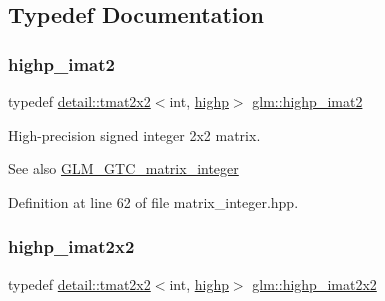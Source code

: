 \subsection{Typedef Documentation}
\mbox{\label{group__gtc__matrix__integer_ga70eae282157f23589db24f4664bbf956}} 
\subsubsection{\texorpdfstring{highp\+\_\+imat2}{highp\_imat2}}
{\footnotesize\ttfamily typedef \hyperlink{structglm_1_1detail_1_1tmat2x2}{detail\+::tmat2x2}$<$int, \hyperlink{namespaceglm_a0f04f086094c747d227af4425893f545ac6f7eab42eacbb10d59a58e95e362074}{highp}$>$ \hyperlink{group__gtc__matrix__integer_ga70eae282157f23589db24f4664bbf956}{glm\+::highp\+\_\+imat2}}

High-\/precision signed integer 2x2 matrix. \begin{DoxySeeAlso}{See also}
\hyperlink{group__gtc__matrix__integer}{G\+L\+M\+\_\+\+G\+T\+C\+\_\+matrix\+\_\+integer} 
\end{DoxySeeAlso}


Definition at line 62 of file matrix\+\_\+integer.\+hpp.

\mbox{\label{group__gtc__matrix__integer_ga9646ff5ef973234755e63e727c5a37fc}} 
\subsubsection{\texorpdfstring{highp\+\_\+imat2x2}{highp\_imat2x2}}
{\footnotesize\ttfamily typedef \hyperlink{structglm_1_1detail_1_1tmat2x2}{detail\+::tmat2x2}$<$int, \hyperlink{namespaceglm_a0f04f086094c747d227af4425893f545ac6f7eab42eacbb10d59a58e95e362074}{highp}$>$ \hyperlink{group__gtc__matrix__integer_ga9646ff5ef973234755e63e727c5a37fc}{glm\+::highp\+\_\+imat2x2}}

